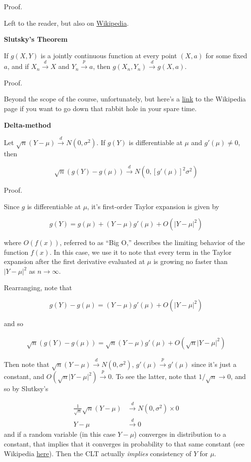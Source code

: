 \documentclass[
  letterpaper,
  DIV=11,
  numbers=noendperiod]{scrreprt}
\begin{document}
Proof.

Left to the reader, but also on
\href{https://en.wikipedia.org/wiki/Continuous_mapping_theorem\#Proof}{Wikipedia}.

\textbf{Slutsky's Theorem}

If \(g(X, Y)\) is a jointly continuous function at every point
\((X, a)\) for some fixed \(a\), and if \(X_n \overset{d}{\to} X\) and
\(Y_n \overset{p}{\to} a\), then
\(g(X_n, Y_n) \overset{d}{\to} g(X, a)\).

Proof.

Beyond the scope of the course, unfortunately, but here's a
\href{https://en.wikipedia.org/wiki/Slutsky\%27s_theorem\#Proof}{link}
to the Wikipedia page if you want to go down that rabbit hole in your
spare time.

\textbf{Delta-method}

Let \(\sqrt{n} (Y - \mu) \overset{d}{\to} N(0, \sigma^2)\). If \(g(Y)\)
is differentiable at \(\mu\) and \(g'(\mu) \neq 0\), then

\[
\sqrt{n} \left( g(Y) - g(\mu)\right) \overset{d}{\to} N(0, [g'(\mu)]^2 \sigma^2)
\]

Proof.

Since \(g\) is differentiable at \(\mu\), it's first-order Taylor
expansion is given by

\[
g(Y) = g(\mu) + (Y - \mu)g'(\mu) + O(| Y - \mu |^2)
\]

where \(O(f(x))\), referred to as ``Big O,'' describes the limiting
behavior of the function \(f(x)\). In this case, we use it to note that
every term in the Taylor expansion after the first derivative evaluated
at \(\mu\) is growing no faster than \(|Y - \mu|^2\) as
\(n \to \infty\).

Rearranging, note that

\[
g(Y) - g(\mu) =  (Y - \mu)g'(\mu) + O(| Y - \mu |^2)
\]

and so

\begin{align*}
    \sqrt{n}\left( g(Y) - g(\mu) \right) = \sqrt{n}(Y - \mu) g'(\mu) + O(\sqrt{n} |Y - \mu|^2)
\end{align*}

Then note that \(\sqrt{n}(Y - \mu) \overset{d}{\to} N(0, \sigma^2)\),
\(g'(\mu) \overset{p}{\to} g'(\mu)\) since it's just a constant, and
\(O(\sqrt{n} |Y - \mu|^2) \overset{p}{\to} 0\). To see the latter, note
that \(1/\sqrt{n} \to 0\), and so by Slutksy's

\begin{align*}
\frac{1}{\sqrt{n}} \sqrt{n}(Y - \mu) & \overset{d}{\to} N(0, \sigma^2) \times 0 \\
 Y - \mu & \overset{d}{\to} 0
\end{align*} and if a random variable (in this case \(Y - \mu\))
converges in distribution to a constant, that implies that it converges
in probability to that same constant (see Wikipedia
\href{https://en.wikipedia.org/wiki/Proofs_of_convergence_of_random_variables\#propB1}{here}).
Then the CLT actually \emph{implies} consistency of \(Y\) for \(\mu\).
\end{document}
